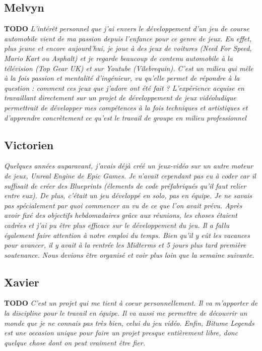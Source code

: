 \documentclass[12pt,a4paper]{article}
\begin{document}
\subsection{Melvyn}
\textbf{TODO}
\textit{L'intérêt personnel que j'ai envers le développement d'un jeu 
    de course automobile vient de ma passion depuis l'enfance pour ce genre de 
    jeux. En effet, plus jeune et encore aujourd'hui, je joue à des jeux de 
    voitures (Need For Speed, Mario Kart ou Asphalt) et je regarde beaucoup 
    de contenu automobile à la télévision (Top Gear UK) et sur Youtube 
    (Vilebrequin). C'est un milieu qui mêle à la fois passion et mentalité 
    d'ingénieur, vu qu'elle permet de répondre à la question : comment ces 
    jeux que j'adore ont été fait ? L'expérience acquise en travaillant 
    directement sur un projet de développement de jeux vidéoludique 
    permettrait de développer mes compétences à la fois techniques et 
    artistiques et d'apprendre concrètement ce qu'est le travail de groupe en 
milieu professionnel}

\subsection{Victorien}
\textit{Quelques années auparavant, j’avais déjà créé un jeux-vidéo 
    sur un autre moteur de jeux, \textit{Unreal Engine} de \textit{Epic Games}. 
    Je n’avait cependant pas eu à coder car il suffisait de créer des
    \textit{Blueprints} (élements de code préfabriqués qu’il faut relier 
    entre eux). De plus, c’était un jeu développé en solo, pas en équipe.
    Je ne savais pas spécialement par quoi commencer au vu de ce que l’on
    avait prévu. Après avoir fixé des objectifs hebdomadaires grâce aux 
    réunions, les choses étaient cadrées et j’ai pu être plus efficace sur
    le développement du jeu. Il a fallu également faire attention à notre 
    emploi du temps. Bien qu’il y eût les vacances pour avancer, il y avait 
    à la rentrée les Midterms et 5 jours plus tard première soutenance. 
Nous devions être organisé et voir plus loin que la semaine suivante.}

\subsection{Xavier}
\textbf{TODO}
\textit{C'est un projet qui me tient à coeur personnellement. Il 
    va m'apporter de la discipline pour le travail en équipe. Il va aussi me 
    permettre de découvrir un monde que je ne connais pas très bien, celui du 
    jeu vidéo. Enfin, Bitume Legends est une occasion unique pour faire un projet 
presque entièrement libre, donc quelque chose dont on peut vraiment être fier.}
\clearpage
\end{document}
